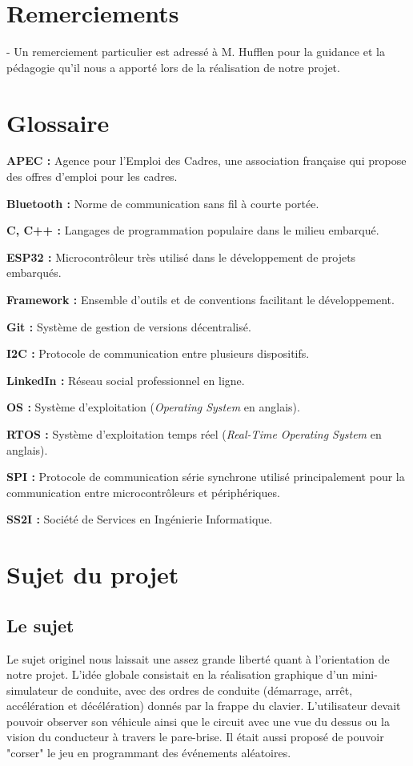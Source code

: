 \documentclass[a4paper,12pt]{report}
\begin{document}
\newpage
\section*{Remerciements}
- Un remerciement particulier est adressé à M. Hufflen pour la guidance et la pédagogie qu'il nous a apporté lors de la réalisation de notre projet.

\newpage
\tableofcontents
\newpage


\newpage
\section*{Glossaire}

\textbf{APEC :} Agence pour l'Emploi des Cadres, une association française qui propose des offres d'emploi pour les cadres.

\textbf{Bluetooth :} Norme de communication sans fil à courte portée.

\textbf{C, C++ :} Langages de programmation populaire dans le milieu embarqué.

\textbf{ESP32 :} Microcontrôleur très utilisé dans le développement de projets embarqués.

\textbf{Framework :} Ensemble d'outils et de conventions facilitant le développement.

\textbf{Git :} Système de gestion de versions décentralisé.

\textbf{I2C :} Protocole de communication entre plusieurs dispositifs.

\textbf{LinkedIn :} Réseau social professionnel en ligne.

\textbf{OS :} Système d'exploitation (\textit{Operating System} en anglais).

\textbf{RTOS :} Système d'exploitation temps réel (\textit{Real-Time Operating System} en anglais).

\textbf{SPI :} Protocole de communication série synchrone utilisé principalement pour la communication entre microcontrôleurs et périphériques.

\textbf{SS2I :} Société de Services en Ingénierie Informatique.

\newpage
\section{Sujet du projet}

\subsection{Le sujet}
Le sujet originel nous laissait une assez grande liberté quant à l'orientation de notre projet. L'idée globale consistait en la réalisation graphique d'un mini-simulateur de conduite, avec des ordres de conduite (démarrage, arrêt, accélération et décélération) donnés par la frappe du clavier. L'utilisateur devait pouvoir observer son véhicule ainsi que le circuit avec une vue du dessus ou la vision du conducteur à travers le pare-brise. Il était aussi proposé de pouvoir "corser" le jeu en programmant des événements aléatoires.
\end{document}
